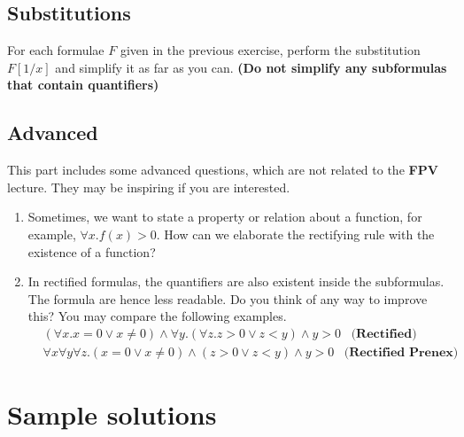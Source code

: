 \documentclass[12pt]{article}
\begin{document}
\subsection*{Substitutions}
For each formulae $F$ given in the previous exercise, perform the substitution $F[1/x]$ and 
simplify it as far as you can. \textbf{(Do not simplify any subformulas that contain quantifiers)}
\subsection*{Advanced}
This part includes some advanced questions, which are not related to the \textbf{FPV} lecture. They 
may be inspiring if you are interested.
\begin{enumerate}
    \item Sometimes, we want to state a property or relation about a function, for example, $\forall x. f(x) > 0$. How can we elaborate
    the rectifying rule with the existence of a function?
    \item In rectified formulas, the quantifiers are also existent inside the subformulas. The formula are 
    hence less readable. Do you think of any way to improve this? You may compare the following examples.
    \begin{align*}
        &(\forall x. x = 0 \lor x \not= 0) \land \forall y. (\forall z. z > 0 \lor z < y) \land y > 0 \;\;\; \textbf{(Rectified)}\\
        &\forall x \forall y \forall z. (x = 0 \lor x \not= 0) \land (z > 0 \lor z < y) \land y > 0 \;\;\; \textbf{(Rectified Prenex)}
    \end{align*}
\end{enumerate}

\newpage 
\section*{Sample solutions}
\end{document}
